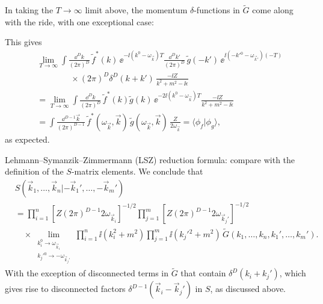 In taking the \(T\to\infty\) limit above, the momentum \(\delta\)-functions in
\(\widetilde G\) come along with the ride, with one exceptional case:

\begin{center}
\end{center}

This gives
\[
\begin{aligned}
&\lim_{T\to\infty}
  \int\frac{\dd^Dk}{(2\pi)^D}\,
  \widetilde f^*(k)\,
  \ee^{-\ii(k^0-\omega_{\vec k})T}
  \frac{\dd^Dk'}{(2\pi)^D}\,
  \widetilde g(-k')\,
  \ee^{\ii(-k'{}^0-\omega_{\vec k'})(-T)}
\\
&\qquad\qquad\times
  (2\pi)^D\delta^D(k+k')\,
  \frac{-\ii Z}{k^2+m^2-\ii\epsilon}
\\
&=
  \lim_{T\to\infty}
  \int\frac{\dd^Dk}{(2\pi)^D}\,
  \widetilde f^*(k)\widetilde g(k)\,
  \ee^{-2\ii(k^0-\omega_{\vec k})T}
  \frac{-\ii Z}{k^2+m^2-\ii\epsilon}
\\
&=
  \int\frac{\dd^{D-1}\vec k}{(2\pi)^{D-1}}\,
  \widetilde f^*(\omega_{\vec k},\vec k)\,
  \widetilde g(\omega_{\vec k},\vec k)\,
  \frac{Z}{2\omega_{\vec k}}
  =
  \langle\phi_f|\phi_g\rangle ,
\end{aligned}
\]
as expected.

Lehmann--Symanzik--Zimmermann (LSZ) reduction formula: compare with the
definition of the \(S\)-matrix elements. We conclude that
\[
\begin{aligned}
&S(\vec k_1,\ldots,\vec k_n|-\vec k_1',\ldots,-\vec k_m')
\\
&=
  \prod_{i=1}^n
  \left[Z(2\pi)^{D-1}2\omega_{\vec k_i}\right]^{-1/2}
  \prod_{j=1}^m
  \left[Z(2\pi)^{D-1}2\omega_{\vec k_j'}\right]^{-1/2}
\\
&\quad\times
  \lim_{\substack{
    k_i^0\to\omega_{\vec k_i}\\
    k_j'{}^0\to-\omega_{\vec k_j'}
  }}
  \prod_{i=1}^n \ii(k_i^2+m^2)
  \prod_{j=1}^m \ii(k_j'{}^2+m^2)\,
  \widetilde G(k_1,\ldots,k_n,k_1',\ldots,k_m') .
\end{aligned}
\]
With the exception of disconnected terms in \(\widetilde G\) that contain
\(\delta^D(k_i+k_j')\), which gives rise to disconnected factors
\(\delta^{D-1}(\vec k_i-\vec k_j')\) in \(S\), as discussed above.

